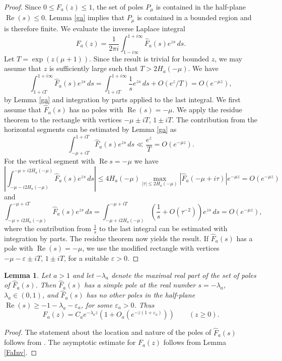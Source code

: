 \documentclass[11pt]{amsart}
\newtheorem{lemma}{Lemma}
\DeclareMathOperator{\re}{Re}
\begin{document}
\begin{proof}
Since $0\le F_a(z) \le 1$,  the set of poles $P_\mu$ is contained in the half-plane $\re(s)\le 0$. 
Lemma \ref{ga} implies that $P_\mu$ is contained in a bounded region and is therefore finite. 
We evaluate the inverse Laplace integral 
$$ F_a(z) = \frac{1}{2\pi i} \int_{1-i\infty}^{1+i\infty} \widehat{F}_a(s) e^{zs}\, d s.$$
Let $T=\exp(z(\mu+1))$.
Since the result is trivial for bounded $z$, we may assume that $z$ is sufficiently large such that $T>2H_a(-\mu)$. We have
$$ \int_{1+iT}^{1+i\infty}  \widehat{F}_a(s) e^{zs}\, d s 
= \int_{1+iT}^{1+i\infty} \frac{1}{s} e^{zs}\, d s + O\left(e^{ z}/T \right)=O\left(e^{-\mu z}\right),$$
by Lemma \ref{ga} and integration by parts applied to the last integral.
We first  assume that $\widehat{F}_a(s)$ has no poles with $\re(s) =-\mu$. 
We apply the residue theorem to the rectangle with vertices $-\mu \pm iT$, $1\pm iT$. 
The contribution from the horizontal segments can be estimated by Lemma \ref{ga} as 
$$ \int_{-\mu+iT}^{1+iT} \widehat{F}_a(s) e^{zs}\,d s \ll \frac{e^{ z}}{T}  =O\left(e^{-\mu z}\right).$$
For the vertical segment with $\re s = -\mu$ we have
$$ \left| \int_{-\mu-i2H_a(-\mu)}^{-\mu+i2H_a(-\mu)} \widehat{F}_a(s) e^{zs}\,d s \right| \le 4H_a(-\mu) \max_{|\tau|\le 2H_a(-\mu)} \left|\widehat{F}_a(-\mu+i\tau)\right| e^{-\mu z} = O\left(e^{-\mu z}\right)$$
and
$$ \int_{-\mu+i2H_a(-\mu)}^{-\mu+iT} \widehat{F}_a(s) e^{zs}\, d s = \int_{-\mu+i2H_a(-\mu)}^{-\mu+iT} \left(\frac{1}{s}+O(\tau^{-2})\right) e^{zs}\,d s =O\left(e^{-\mu z}\right),$$
where the contribution from $\frac{1}{s}$ to the last integral can be estimated with integration by parts. The residue theorem now yields the result.
If $\widehat{F}_a(s)$ has a pole with $\re(s) =-\mu$, we use the modified rectangle with vertices  $-\mu -\varepsilon \pm iT$, $1 \pm iT$, 
for a suitable $\varepsilon >0$. 
\end{proof}


\begin{lemma}\label{lemag1}
Let $a>1$ and let $-\lambda_a$ denote the maximal real part of the set of poles of  $\widehat{F}_a(s)$.
Then $\widehat{F}_a(s)$ has a simple pole at the real number $s=-\lambda_a$, $\lambda_a \in (0,1)$, and 
 $\widehat{F}_a(s)$  has no other poles in the half-plane $\re(s) \ge -1 -\lambda_a -\varepsilon_a$, for some $\varepsilon_a>0$. 
Thus 
$$F_a(z) = C_a e^{-\lambda_a z}(1+O_a(e^{-z(1+\varepsilon_a)})) \qquad (z\ge 0).$$ 
\end{lemma}

\begin{proof}
The statement about the location and nature of the poles of $\widehat{F}_a(s)$ follows from \cite[Lemma 9]{SPA}.
The asymptotic estimate for $F_a(z)$ follows from Lemma \ref{FaInv}.
\end{proof}
\end{document}
